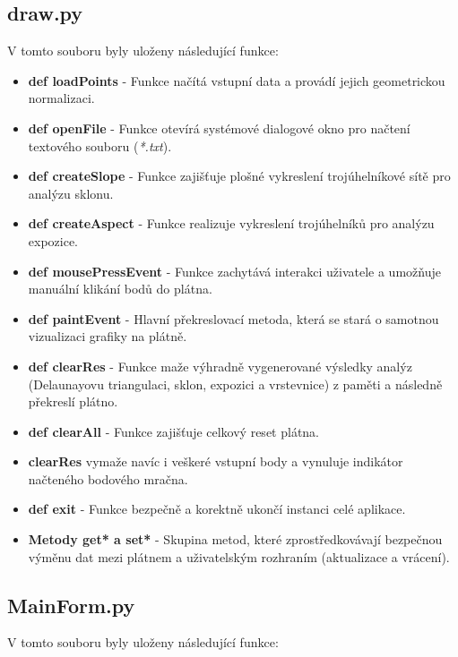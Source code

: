 \documentclass[9pt, a4paper]{article}
\begin{document}
\newpage
\subsection*{draw.py}
\vspace{0.3 cm}
V tomto souboru byly uloženy následující funkce:
\vspace{0.3 cm}

\begin{itemize}
\item \textbf{def loadPoints} - Funkce načítá vstupní data a provádí jejich geometrickou normalizaci.
\item \textbf{def openFile} - Funkce otevírá systémové dialogové okno pro načtení textového souboru (\textit{*.txt}).
\item \textbf{def createSlope} - Funkce zajišťuje plošné vykreslení trojúhelníkové sítě pro analýzu sklonu.
\item \textbf{def createAspect} - Funkce realizuje vykreslení trojúhelníků pro analýzu expozice. 
\item \textbf{def mousePressEvent} - Funkce zachytává interakci uživatele a umožňuje manuální klikání bodů do plátna.
\item \textbf{def paintEvent} - Hlavní překreslovací metoda, která se stará o samotnou vizualizaci grafiky na plátně.
\item \textbf{def clearRes} - Funkce maže výhradně vygenerované výsledky analýz (Delaunayovu triangulaci, sklon, expozici a vrstevnice) z paměti a následně překreslí plátno.
\item \textbf{def clearAll} - Funkce zajišťuje celkový reset plátna.
\item \textbf{clearRes} vymaže navíc i veškeré vstupní body a vynuluje indikátor načteného bodového mračna.
\item \textbf{def exit} - Funkce bezpečně a korektně ukončí instanci celé aplikace.
\item \textbf{Metody get* a set*} - Skupina metod, které zprostředkovávají bezpečnou výměnu dat mezi plátnem a uživatelským rozhraním (aktualizace a vrácení).
\end{itemize}

\subsection*{MainForm.py}
\vspace{0.3 cm}
V tomto souboru byly uloženy následující funkce:
\vspace{0.3 cm}
\end{document}
